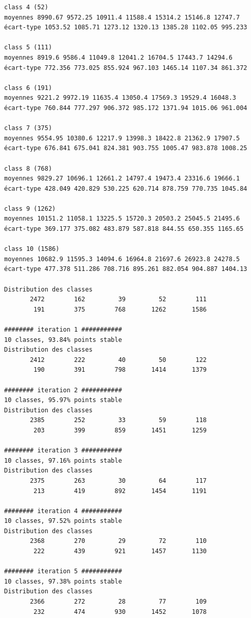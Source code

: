 \documentclass[earth,article,submit,pdftex,moreauthors]{Definitions/mdpi}
\begin{document}
{\begin{scriptsize}
\begin{verbatim}
class 4 (52)
moyennes 8990.67 9572.25 10911.4 11588.4 15314.2 15146.8 12747.7
écart-type 1053.52 1085.71 1273.12 1320.13 1385.28 1102.05 995.233

class 5 (111)
moyennes 8919.6 9586.4 11049.8 12041.2 16704.5 17443.7 14294.6
écart-type 772.356 773.025 855.924 967.103 1465.14 1107.34 861.372

class 6 (191)
moyennes 9221.2 9972.19 11635.4 13050.4 17569.3 19529.4 16048.3
écart-type 760.844 777.297 906.372 985.172 1371.94 1015.06 961.004

class 7 (375)
moyennes 9554.95 10380.6 12217.9 13998.3 18422.8 21362.9 17907.5
écart-type 676.841 675.041 824.381 903.755 1005.47 983.878 1008.25

class 8 (768)
moyennes 9829.27 10696.1 12661.2 14797.4 19473.4 23316.6 19666.1
écart-type 428.049 420.829 530.225 620.714 878.759 770.735 1045.84

class 9 (1262)
moyennes 10151.2 11058.1 13225.5 15720.3 20503.2 25045.5 21495.6
écart-type 369.177 375.082 483.879 587.818 844.55 650.355 1165.65

class 10 (1586)
moyennes 10682.9 11595.3 14094.6 16964.8 21697.6 26923.8 24278.5
écart-type 477.378 511.286 708.716 895.261 882.054 904.887 1404.13

Distribution des classes
       2472        162         39         52        111
        191        375        768       1262       1586

######## iteration 1 ###########
10 classes, 93.84% points stable
Distribution des classes
       2412        222         40         50        122
        190        391        798       1414       1379

######## iteration 2 ###########
10 classes, 95.97% points stable
Distribution des classes
       2385        252         33         59        118
        203        399        859       1451       1259

######## iteration 3 ###########
10 classes, 97.16% points stable
Distribution des classes
       2375        263         30         64        117
        213        419        892       1454       1191

######## iteration 4 ###########
10 classes, 97.52% points stable
Distribution des classes
       2368        270         29         72        110
        222        439        921       1457       1130

######## iteration 5 ###########
10 classes, 97.38% points stable
Distribution des classes
       2366        272         28         77        109
        232        474        930       1452       1078


\end{verbatim}
\end{scriptsize}}
\end{document}
